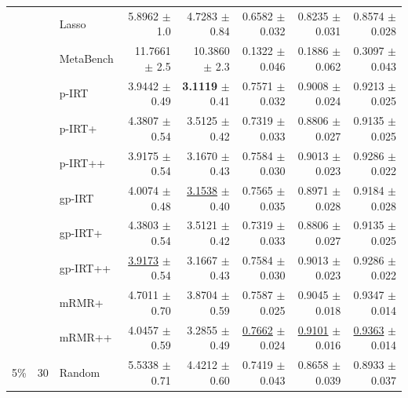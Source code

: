 \begin{longtable}{llp{}rrrrr}
 &  & Lasso & 5.8962 {\scriptsize $\pm$ 1.0} & 4.7283 {\scriptsize $\pm$ 0.84} & 0.6582 {\scriptsize $\pm$ 0.032} & 0.8235 {\scriptsize $\pm$ 0.031} & 0.8574 {\scriptsize $\pm$ 0.028} \\
 &  & MetaBench & 11.7661 {\scriptsize $\pm$ 2.5} & 10.3860 {\scriptsize $\pm$ 2.3} & 0.1322 {\scriptsize $\pm$ 0.046} & 0.1886 {\scriptsize $\pm$ 0.062} & 0.3097 {\scriptsize $\pm$ 0.043} \\
 &  & p-IRT & 3.9442 {\scriptsize $\pm$ 0.49} & \textbf{3.1119} {\scriptsize $\pm$ 0.41} & 0.7571 {\scriptsize $\pm$ 0.032} & 0.9008 {\scriptsize $\pm$ 0.024} & 0.9213 {\scriptsize $\pm$ 0.025} \\
 &  & p-IRT+ & 4.3807 {\scriptsize $\pm$ 0.54} & 3.5125 {\scriptsize $\pm$ 0.42} & 0.7319 {\scriptsize $\pm$ 0.033} & 0.8806 {\scriptsize $\pm$ 0.027} & 0.9135 {\scriptsize $\pm$ 0.025} \\
 &  & p-IRT++ & 3.9175 {\scriptsize $\pm$ 0.54} & 3.1670 {\scriptsize $\pm$ 0.43} & 0.7584 {\scriptsize $\pm$ 0.030} & 0.9013 {\scriptsize $\pm$ 0.023} & 0.9286 {\scriptsize $\pm$ 0.022} \\
 &  & gp-IRT & 4.0074 {\scriptsize $\pm$ 0.48} & \underline{3.1538} {\scriptsize $\pm$ 0.40} & 0.7565 {\scriptsize $\pm$ 0.035} & 0.8971 {\scriptsize $\pm$ 0.028} & 0.9184 {\scriptsize $\pm$ 0.028} \\
 &  & gp-IRT+ & 4.3803 {\scriptsize $\pm$ 0.54} & 3.5121 {\scriptsize $\pm$ 0.42} & 0.7319 {\scriptsize $\pm$ 0.033} & 0.8806 {\scriptsize $\pm$ 0.027} & 0.9135 {\scriptsize $\pm$ 0.025} \\
 &  & gp-IRT++ & \underline{3.9173} {\scriptsize $\pm$ 0.54} & 3.1667 {\scriptsize $\pm$ 0.43} & 0.7584 {\scriptsize $\pm$ 0.030} & 0.9013 {\scriptsize $\pm$ 0.023} & 0.9286 {\scriptsize $\pm$ 0.022} \\
 &  & mRMR+ & 4.7011 {\scriptsize $\pm$ 0.70} & 3.8704 {\scriptsize $\pm$ 0.59} & 0.7587 {\scriptsize $\pm$ 0.025} & 0.9045 {\scriptsize $\pm$ 0.018} & 0.9347 {\scriptsize $\pm$ 0.014} \\
 &  & mRMR++ & 4.0457 {\scriptsize $\pm$ 0.59} & 3.2855 {\scriptsize $\pm$ 0.49} & \underline{0.7662} {\scriptsize $\pm$ 0.024} & \underline{0.9101} {\scriptsize $\pm$ 0.016} & \underline{0.9363} {\scriptsize $\pm$ 0.014} \\
\midrule
5\% & 30 & Random & 5.5338 {\scriptsize $\pm$ 0.71} & 4.4212 {\scriptsize $\pm$ 0.60} & 0.7419 {\scriptsize $\pm$ 0.043} & 0.8658 {\scriptsize $\pm$ 0.039} & 0.8933 {\scriptsize $\pm$ 0.037} \\

\end{longtable}
